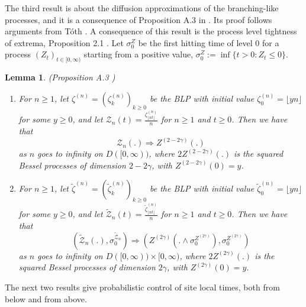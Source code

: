 \documentclass[twoside,12pt, a4paper]{article}
\newtheorem{lemma}{Lemma}[section]
\numberwithin{equation}{section}
\theoremstyle{remark}
\begin{document}
	The third result is about the diffusion approximations of the branching-like processes, and it is a consequence of Proposition A.3 in \cite{KMP23}. Its proof follows arguments from T\'{o}th \cite{T96}. A consequence of this result is the process level tightness of extrema, Proposition 2.1 \cite{KMP23}. 
	Let $\sigma_0^Z$ be the first hitting time of level $0$ for a process $\left( Z_t \right) _{t \in [0,\infty )}$ starting from a positive value, $\sigma_0^Z := \inf \{t>0: Z_t \le 0\} $.
	\begin{lemma}(Proposition A.3 \cite{KMP23})\label{lm: diffusion approximation of blp}
		\begin{enumerate}
			\item 
			For $n\geq 1$, let $\zeta^{(n)}=(\zeta^{(n)}_k)_{k\geq 0 }  $ be the BLP with initial value $\zeta^{(n)}_0 = \lfloor yn \rfloor$ for some $y \geq 0$, and let $\mathcal{Z}_n(t) = \frac{\zeta^{(n)}_{\lfloor nt \rfloor}}{n}$ for $n\geq 1$ and $t\geq 0$. Then we have that 
			\[
			\mathcal{Z}_n(.) \Longrightarrow Z^{(2-2\gamma)}(.)
			\] 
			as $n$ goes to infinity on $D([0,\infty))$, where $2Z^{(2-2\gamma)}(.)$ is the squared Bessel processes of dimension $2-2\gamma$, with $Z^{(2 - 2 \gamma)}(0) = y$.
			
			\item
			For $n\geq 1$, let $\tilde\zeta^{(n)}=(\tilde\zeta^{(n)}_k)_{k\geq 0 }  $ be the BLP with initial value $\tilde\zeta^{(n)}_0 = \lfloor yn \rfloor$ for some $y \geq 0$, and let $\tilde{\mathcal{Z}}_n(t) = \frac{\tilde\zeta^{(n)}_{\lfloor nt \rfloor}}{n}$ for $n\geq 1$ and $t\geq 0$. Then we have that 
			\[
			\left(\tilde{\mathcal{Z}}_n(.), \sigma_0^{\tilde{\mathcal{Z}}_n}\right) 
			\Longrightarrow \left(Z^{(2\gamma)}(. \wedge \sigma_0^{Z^{(2 \gamma)}}), \sigma_0^{Z^{(2 \gamma)}}\right)
			\]
			as $n$ goes to infinity on $D([0,\infty)) \times [0,\infty )$, where $2Z^{(2\gamma)}(.)$ is the squared Bessel processes of dimension $2\gamma$, with $Z^{( 2 \gamma)}(0) = y$.
		\end{enumerate}
		
		
	\end{lemma}
	
	
	The next two results give probabilistic control of site local times, both from below and from above.
	
\end{document}
